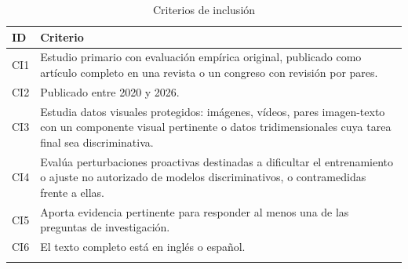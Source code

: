 \begin{table}[t]
\caption{Criterios de inclusión}\label{tab:inclusion}
\footnotesize
\begin{tabularx}{\textwidth}{@{}L{0.9cm}Y{1.0}@{}}
\toprule
ID & Criterio \\
\midrule
CI1 & Estudio primario con evaluación empírica original, publicado como artículo completo en una revista o un congreso con revisión por pares. \\
CI2 & Publicado entre 2020 y 2026. \\
CI3 & Estudia datos visuales protegidos: imágenes, vídeos, pares imagen-texto con un componente visual pertinente o datos tridimensionales cuya tarea final sea discriminativa. \\
CI4 & Evalúa perturbaciones proactivas destinadas a dificultar el entrenamiento o ajuste no autorizado de modelos discriminativos, o contramedidas frente a ellas. \\
CI5 & Aporta evidencia pertinente para responder al menos una de las preguntas de investigación. \\
CI6 & El texto completo está en inglés o español. \\
\botrule
\end{tabularx}
\end{table}
